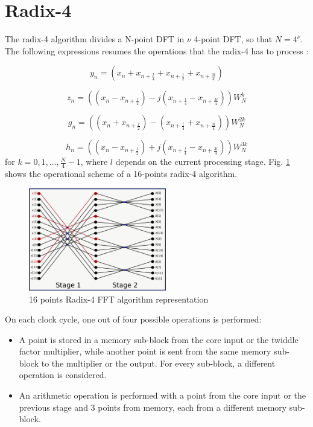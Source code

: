\documentclass[conference]{IEEEtran}
\begin{document}
\section{Radix-4}

The radix-4 algorithm divides a N-point DFT in $\nu$ 4-point DFT, so that $N = 4^\nu$.
The following expressions resumes the operations that the radix-4 has to process \cite{MeyerRadix}:

\begin{equation}
y_n = (x_n + x_{n+\frac{l}{4}} + x_{n+\frac{l}{2}} + x_{n+\frac{3l}{4}})
\label{eq:radix4_suby}
\end{equation}

\begin{equation}
z_n = ((x_n - x_{n+\frac{l}{2}}) -j (x_{n+\frac{l}{4}}
-x_{n+\frac{3l}{4}})) W_N^{k}
\label{eq:radix4_subz}
\end{equation}

\begin{equation}
g_n = ((x_n + x_{n+\frac{l}{2}}) - (x_{n+\frac{l}{4}}
+ x_{n+\frac{3l}{4}})) W_N^{2k}
\label{eq:radix4_subg}
\end{equation}

\begin{equation}
h_n = ((x_n - x_{n+\frac{l}{2}}) +j (x_{n+\frac{l}{4}} - x_{n+\frac{3l}{4}})) W_N^{3k}
\label{eq:radix4_subh}
\end{equation}
for $k = 0,1,\ldots,\frac{N}{4}-1$, where $l$ depends on the current processing stage.
Fig. \ref{fig:r4_diag} shows the operational scheme of a 16-points radix-4 algorithm.

\begin{figure}[htb!]
        \centering
        \includegraphics[width=6cm]{./figures/r4_16.png}
        \caption{16 points Radix-4 FFT algorithm representation}
        \label{fig:r4_diag}
\end{figure}

On each clock cycle, one out of four possible operations is performed:

\begin{itemize}
  \item A point is stored in a memory sub-block from the core input or the twiddle factor multiplier, while another point is sent 
  from the same memory sub-block to the multiplier or the output. For every sub-block, a different operation is considered.
  \item An arithmetic operation is performed with a point from the core input or the previous stage and 3 points from memory, each
  from a different memory sub-block. 
\end{itemize}
\end{document}
